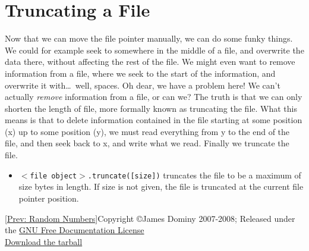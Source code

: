 \documentclass[a4paper,11pt]{article}
\begin{document}
\section{Truncating a File}

Now that we can move the file pointer manually, we can do some funky   things. We could for example seek to somewhere in the middle of a file,   and overwrite the data there, without affecting the rest of the file.   We might even want to remove information from a file, where we seek to   the start of the information, and overwrite it with\ldots\ well, spaces. Oh   dear, we have a problem here! We can't actually \textit{remove}   information from a file, or can we? The truth is that we can only   shorten the length of file, more formally known as truncating the file.   What this means is that to delete information contained in the file   starting at some position (x) up to some position (y), we must read   everything from y to the end of the file, and then seek back to x, and   write what we read. Finally we truncate the file.
\begin{itemize}
	\item 
\texttt{$<$file object$>$.truncate([size])} truncates the    file to be a maximum of size bytes in length. If size is not given,    the file is truncated at the current file pointer position.
\end{itemize}    [\href{random.html}{Prev: Random Numbers}]      Copyright \copyright James Dominy 2007-2008; Released under the \href{http://www.gnu.org/copyleft/fdl.html}{GNU Free Documentation License}
\\\href{intropython.tar.gz}{Download the tarball}
\end{document}
